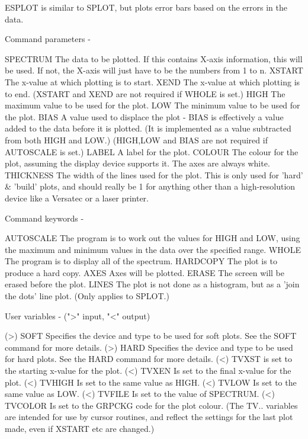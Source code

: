 \begin{description}
\begin{description}
\begin{terminalv}
 ESPLOT is similar to SPLOT, but plots error bars based on the
 errors in the data.

 Command parameters -

 SPECTRUM    The data to be plotted.  If this contains X-axis
             information, this will be used.  If not, the X-axis
             will just have to be the numbers from 1 to n.
 XSTART      The x-value at which plotting is to start.
 XEND        The x-value at which plotting is to end.
             (XSTART and XEND are not required if WHOLE is set.)
 HIGH        The maximum value to be used for the plot.
 LOW         The minimum value to be used for the plot.
 BIAS        A value used to displace the plot - BIAS is
             effectively a value added to the data before
             it is plotted. (It is implemented as a value
             subtracted from both HIGH and LOW.)
             (HIGH,LOW and BIAS are not required if
             AUTOSCALE is set.)
 LABEL       A label for the plot.
 COLOUR      The colour for the plot, assuming the display device
             supports it.  The axes are always white.
 THICKNESS   The width of the lines used for the plot.  This is
             only used for 'hard' & 'build' plots, and should
             really be 1 for anything other than a high-resolution
             device like a Versatec or a laser printer.

 Command keywords -

 AUTOSCALE   The program is to work out the values for HIGH
             and LOW, using the maximum and minimum values
             in the data over the specified range.
 WHOLE       The program is to display all of the spectrum.
 HARDCOPY    The plot is to produce a hard copy.
 AXES        Axes will be plotted.
 ERASE       The screen will be erased before the plot.
 LINES       The plot is not done as a histogram, but as
             a 'join the dots' line plot.  (Only applies
             to SPLOT.)

 User variables -    (">" input, "<" output)

 (>) SOFT    Specifies the device and type to be used for soft
             plots.  See the SOFT command for more details.
 (>) HARD    Specifies the device and type to be used for hard
             plots.  See the HARD command for more details.
 (<) TVXST   is set to the starting x-value for the plot.
 (<) TVXEN   Is set to the final x-value for the plot.
 (<) TVHIGH  Is set to the same value as HIGH.
 (<) TVLOW   Is set to the same value as LOW.
 (<) TVFILE  Is set to the value of SPECTRUM.
 (<) TVCOLOR Is set to the GRPCKG code for the plot colour.
             (The TV.. variables are intended for use by
             cursor routines, and reflect the settings for the
             last plot made, even if XSTART etc are changed.)


\end{terminalv}
\end{description}
\end{description}
